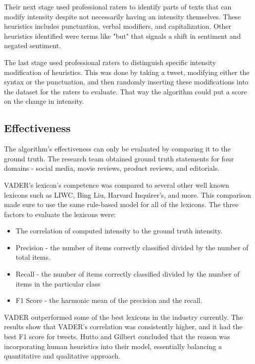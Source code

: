 \documentclass[11pt, twoside, reqno]{book}
\begin{document}
Their next stage used professional raters to identify parts of texts that can modify intensity despite not necessarily having an intensity themselves. These heuristics includes punctuation, verbal modifiers, and capitalization. Other heuristics identified were terms like "but" that signals a shift in sentiment and negated sentiment. 

The last stage used professional raters to distinguish specific intensity modification of heuristics. This was done by taking a tweet, modifying either the syntax or the punctuation, and then randomly inserting these modifications into the dataset for the raters to evaluate. That way the algorithm could put a score on the change in intensity. 

\subsection{Effectiveness}
\hspace{0.2in} The algorithm's effectiveness can only be evaluated by comparing it to the ground truth. The research team obtained ground truth statements for four domains - social media, movie reviews, product reviews, and editorials. 

VADER's lexicon's competence was compared to several other well known lexicons such as LIWC, Bing Liu, Harvard Inquirer's, and more. This comparison made sure to use the same rule-based model for all of the lexicons. The three factors to evaluate the lexicons were:
\begin{itemize}
	\item The correlation of computed intensity to the ground truth intensity. 
	\item Precision - the number of items correctly classified divided by the number of total items. 
	\item Recall - the number of items correctly classified divided by the number of items in the particular class
	\item F1 Score - the harmonic mean of the precision and the recall.
\end{itemize}

VADER outperformed some of the best lexicons in the industry currently. The results show that VADER's correlation was consistently higher, and it had the best F1 score for tweets. Hutto and Gilbert concluded that the reason was incorporating human heuristics into their model, essentially balancing a quantitative and qualitative approach. 
\end{document}
